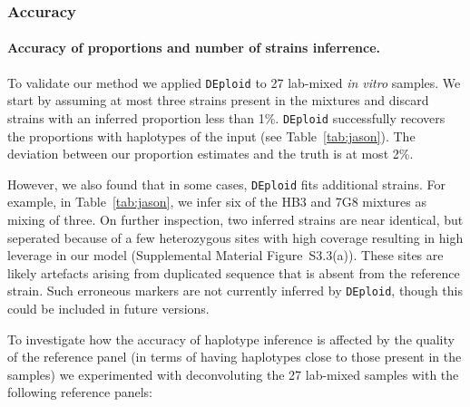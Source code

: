 \documentclass{nature}
\begin{document}
\subsubsection*{Accuracy}

\paragraph{Accuracy of proportions and number of strains inferrence.}
To validate our method we applied \texttt{DEploid} to 27 lab-mixed {\it in vitro} samples. We start by assuming at most three strains present in the mixtures and discard strains with an inferred proportion less than 1\%. \texttt{DEploid} successfully recovers the proportions with haplotypes of the input (see Table~\ref{tab:jason}). The deviation between our proportion estimates and the truth is at most 2\%.

However, we also found that in some cases, \texttt{DEploid} fits additional strains. For example, in Table~\ref{tab:jason}, we infer six of the HB3 and 7G8 mixtures as mixing of three.  On further inspection, two inferred strains are near identical, but seperated because of a few heterozygous sites with high coverage resulting in high leverage in our model (Supplemental Material Figure~S3.3(a)). These sites are likely artefacts arising from duplicated sequence that is absent from the reference strain.  Such erroneous markers are not currently inferred by \texttt{DEploid}, though this could be included in future versions.

To investigate how the accuracy of haplotype inference is affected by the quality of the reference panel (in terms of having haplotypes close to those present in the samples) we experimented with deconvoluting the 27 lab-mixed samples with the following reference panels:
\end{document}
